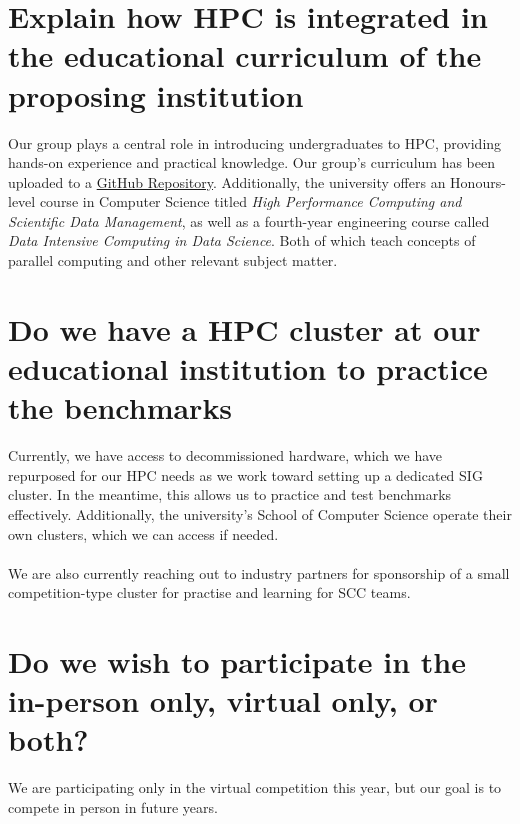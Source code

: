 \documentclass[10pt, onecolumn]{IEEEtran}
\begin{document}
\section{Explain how HPC is integrated in the educational curriculum of the proposing institution}
\noindent
Our group plays a central role in introducing undergraduates to HPC, providing hands-on experience and practical knowledge. Our group's curriculum has been uploaded to a \href{https://github.com/WitsHPC/HPC-InterestGroup}{GitHub Repository}. Additionally, the university offers an Honours-level course in Computer Science titled \textit{High Performance Computing and Scientific Data Management}, as well as a fourth-year engineering course called \textit{Data Intensive Computing in Data Science}. Both of which teach concepts of parallel computing and other relevant subject matter.
\section{Do we have a HPC cluster at our educational institution to practice the benchmarks}
\noindent
Currently, we have access to decommissioned hardware, which we have repurposed for our HPC needs as we work toward setting up a dedicated SIG cluster. In the meantime, this allows us to practice and test benchmarks effectively. Additionally, the university’s School of Computer Science operate their own clusters, which we can access if needed.
\\\\
We are also currently reaching out to industry partners for sponsorship of a small competition-type cluster for practise and learning for SCC teams.
\section{Do we wish to participate in the in-person only, virtual only, or both?}
\noindent
We are participating only in the virtual competition this year, but our goal is to compete in person in future years.
%
%
\label{lastBodyPage}
\newpage
{}
\appendices
\label{lastRomanPage}
\end{document}
